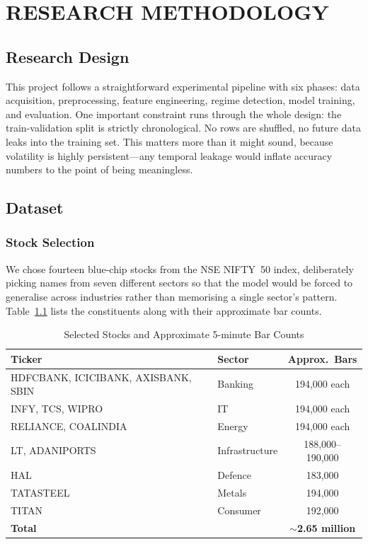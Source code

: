 \chapter{RESEARCH METHODOLOGY}
\label{ChapterResearchMethodology}

\section{Research Design}

This project follows a straightforward experimental pipeline with six phases: data acquisition, preprocessing, feature engineering, regime detection, model training, and evaluation. One important constraint runs through the whole design: the train-validation split is strictly chronological. No rows are shuffled, no future data leaks into the training set. This matters more than it might sound, because volatility is highly persistent---any temporal leakage would inflate accuracy numbers to the point of being meaningless.

\section{Dataset}

\subsection{Stock Selection}

We chose fourteen blue-chip stocks from the NSE NIFTY~50 index, deliberately picking names from seven different sectors so that the model would be forced to generalise across industries rather than memorising a single sector's pattern. Table~\ref{tab:stocks} lists the constituents along with their approximate bar counts.

\begin{table}[h!]
\caption{Selected Stocks and Approximate 5-minute Bar Counts}
\label{tab:stocks}
\centering
\small
\begin{tabular}{llc}
\hline
\textbf{Ticker} & \textbf{Sector} & \textbf{Approx.\ Bars} \\
\hline
HDFCBANK, ICICIBANK, AXISBANK, SBIN & Banking & 194,000 each \\
INFY, TCS, WIPRO & IT & 194,000 each \\
RELIANCE, COALINDIA & Energy & 194,000 each \\
LT, ADANIPORTS & Infrastructure & 188,000--190,000 \\
HAL & Defence & 183,000 \\
TATASTEEL & Metals & 194,000 \\
TITAN & Consumer & 192,000 \\
\hline
\multicolumn{2}{l}{\textbf{Total}} & $\sim$\textbf{2.65 million} \\
\hline
\end{tabular}
\end{table}

